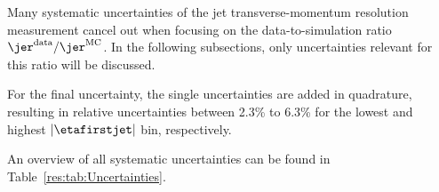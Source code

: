 Many systematic uncertainties of the jet transverse-momentum resolution measurement cancel out when focusing on the data-to-simulation ratio $\jer^{\text{data}}/\jer^{\text{MC}}$.
In the following subsections, only uncertainties relevant for this ratio will be discussed.

For the final uncertainty, the single uncertainties are added in quadrature, resulting in relative uncertainties between 2.3\% to 6.3\% for the lowest and highest $|\etafirstjet|$ bin, respectively. 

An overview of all systematic uncertainties can be found in Table~\ref{res:tab:Uncertainties}.

\renewcommand{\arraystretch}{1.1}
\begin{table}[h]
\centering
\caption{All relative systematic uncertainties on the data-to-simulation ratio $\jer^{\text{data}}/\jer^{\text{MC}}$ listed by sources for the different $|\eta^{\text{jet}}|$ bins.}
\label{res:tab:Uncertainties}
\end{table}
